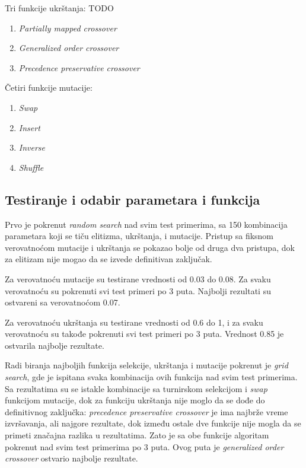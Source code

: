 \documentclass[12pt, a4paper]{article}
\begin{document}
Tri funkcije ukrštanja: TODO
\begin{enumerate}
	\item \textit{Partially mapped crossover}
	\item \textit{Generalized order crossover}
	\item \textit{Precedence preservative crossover} \\
\end{enumerate}

 Četiri funkcije mutacije:
\begin{enumerate}
	\item \textit{Swap}
	\item \textit{Insert}
	\item \textit{Inverse} 
	\item \textit{Shuffle} \\
\end{enumerate}

\subsection{Testiranje i odabir parametara i funkcija}
Prvo je pokrenut \textit{random search} nad svim test primerima, sa 150 kombinacija parametara koji se tiču elitizma, ukrštanja, i mutacije. Pristup sa fiksnom verovatnoćom mutacije i ukrštanja se pokazao bolje od druga dva pristupa, dok za elitizam nije mogao da se izvede definitivan zaključak.

Za verovatnoću mutacije su testirane vrednosti od 0.03 do 0.08. Za svaku verovatnoću su pokrenuti svi test primeri po 3 puta. Najbolji rezultati su ostvareni sa verovatnoćom 0.07.

Za verovatnoću ukrštanja su testirane vrednosti od 0.6 do 1, i za svaku verovatnoću su takođe pokrenuti svi test primeri po 3 puta. Vrednost 0.85 je ostvarila najbolje rezultate.

Radi biranja najboljih funkcija selekcije, ukrštanja i mutacije pokrenut je \textit{grid search}, gde je ispitana svaka kombinacija ovih funkcija nad svim test primerima. Sa rezultatima su se istakle kombinacije sa turnirskom selekcijom i \textit{swap} funkcijom mutacije, dok za funkciju ukrštanja nije moglo da se dođe do definitivnog zaključka: \textit{precedence preservative crossover} je ima najbrže vreme izvršavanja, ali najgore rezultate, dok između ostale dve funkcije nije mogla da se primeti značajna razlika u rezultatima. Zato je sa obe funkcije algoritam pokrenut nad svim test primerima po 3 puta. Ovog puta je \textit{generalized order crossover} ostvario najbolje rezultate. 
\end{document}
